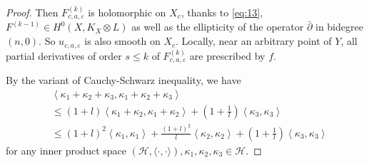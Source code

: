 \documentclass[lang=en,12pt,twoside]{textbook}
\begin{document}
\begin{proof}
Then $F_{c, a, \varepsilon}^{(k)}$ is holomorphic on $X_c$, thanks to \eqref{eq:13}, $F^{(k-1)} \in H^0\left(X, K_X \otimes L\right)$ as well as the ellipticity of the operator $\bar{\partial}$ in bidegree $(n, 0)$. So $u_{c, a, \varepsilon}$ is also smooth on $X_c$. Locally, near an arbitrary point of $Y$, all partial derivatives of order $s\leq k$ of $F_{c, a, \varepsilon}^{(k)}$ are prescribed by $f$.


By the variant of Cauchy-Schwarz inequality, we have
 \begin{equation}\label{eq:15}
   \begin{aligned}
   &\left\langle\kappa_1+\kappa_2+\kappa_3, \kappa_1+\kappa_2+\kappa_3\right\rangle \\
   & \leq (1+l)\left\langle\kappa_1+\kappa_2, \kappa_1+\kappa_2\right\rangle+(1+\frac{1}{l})\left\langle\kappa_3, \kappa_3\right\rangle \\
   & \leq (1+l)^2 \left\langle\kappa_1, \kappa_1\right\rangle+\frac{(1+l)^2}{l}\left\langle\kappa_2, \kappa_2\right\rangle+(1+\frac{1}{l})\left\langle\kappa_3, \kappa_3\right\rangle
   \end{aligned}
 \end{equation}
for any inner product space $(\mathcal{H},\langle\cdot, \cdot\rangle), \kappa_1, \kappa_2, \kappa_3 \in \mathcal{H}$.


\end{proof}
\end{document}
